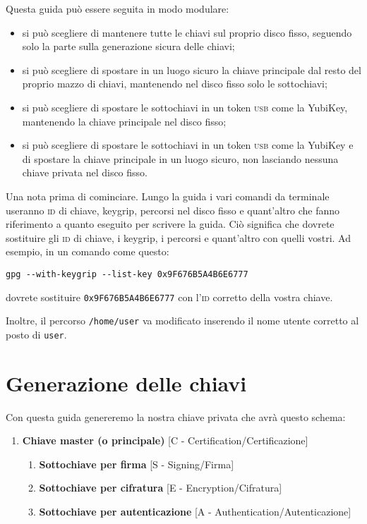 \documentclass[a4paper,10pt]{article}
\begin{document}
Questa guida può essere seguita in modo modulare:

\begin{itemize}
 \item si può scegliere di mantenere tutte le chiavi sul proprio disco fisso, seguendo solo la parte sulla generazione sicura delle chiavi;
 \item si può scegliere di spostare in un luogo sicuro la chiave principale dal resto del proprio mazzo di chiavi, mantenendo nel disco fisso solo le sottochiavi;
 \item si può scegliere di spostare le sottochiavi in un token \textsc{usb} come la YubiKey, mantenendo la chiave principale nel disco fisso;
 \item si può scegliere di spostare le sottochiavi in un token \textsc{usb} come la YubiKey e di spostare la chiave principale in un luogo sicuro, non lasciando nessuna chiave privata nel disco fisso.
\end{itemize}

Una nota prima di cominciare. Lungo la guida i vari comandi da terminale useranno \textsc{id} di chiave, keygrip, percorsi nel disco fisso e quant'altro che fanno riferimento a quanto eseguito per scrivere la guida. Ciò significa che dovrete sostituire gli \textsc{id} di chiave, i keygrip, i percorsi e quant'altro con quelli vostri. Ad esempio, in un comando come questo:

\begin{lstlisting}
gpg --with-keygrip --list-key 0x9F676B5A4B6E6777
\end{lstlisting}

dovrete sostituire \texttt{0x9F676B5A4B6E6777} con l'\textsc{id} corretto della vostra chiave.

Inoltre, il percorso \texttt{/home/user} va modificato inserendo il nome utente corretto al posto di \texttt{user}.

\section{Generazione delle chiavi}

Con questa guida genereremo la nostra chiave privata che avrà questo schema:

\begin{enumerate}
 \item \textbf{Chiave master (o principale)} [C - Certification/Certificazione]
 \begin{enumerate}
  \item \textbf{Sottochiave per firma} [S - Signing/Firma]
  \item \textbf{Sottochiave per cifratura} [E - Encryption/Cifratura]
  \item \textbf{Sottochiave per autenticazione} [A - Authentication/Autenticazione]
 \end{enumerate}
\end{enumerate}
\end{document}
